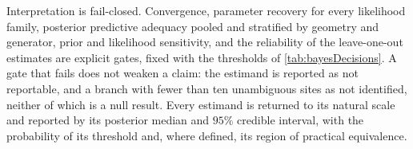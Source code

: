 Interpretation is fail-closed. Convergence, parameter recovery for every likelihood family, posterior predictive adequacy pooled and stratified by geometry and generator, prior and likelihood sensitivity, and the reliability of the leave-one-out estimates are explicit gates, fixed with the thresholds of \autoref{tab:bayesDecisions}. A gate that fails does not weaken a claim: the estimand is reported as not reportable, and a branch with fewer than ten unambiguous sites as not identified, neither of which is a null result. Every estimand is returned to its natural scale and reported by its posterior median and $95\%$ credible interval, with the probability of its threshold and, where defined, its region of practical equivalence.
\endgroup
